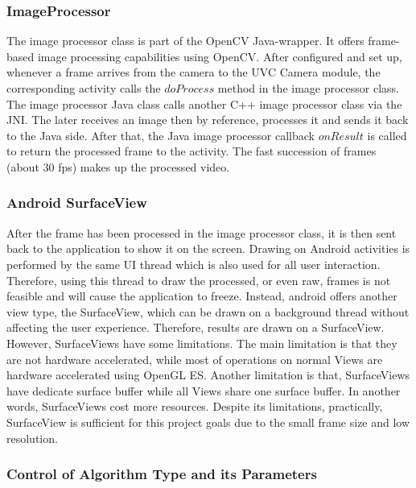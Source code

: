 \subsubsection{ImageProcessor}

The image processor class is part of the OpenCV Java-wrapper. It offers frame-based image processing capabilities using OpenCV. After configured and set up, whenever a frame arrives from the camera to the UVC Camera module, the corresponding activity calls the $doProcess$ method in the image processor class. The image processor Java class calls another C++ image processor class via the JNI. The later receives an image then by reference, processes it and sends it back to the Java side. After that, the Java image processor callback $onResult$ is called to return the processed frame to the activity. The fast succession of frames (about 30 fps) makes up the processed video.


\subsubsection{Android SurfaceView}
After the frame has been processed in the image processor class, it is then sent back to the application to show it on the screen. Drawing on Android activities is performed by the same UI thread which is also used for all user interaction. Therefore, using this thread to draw the processed, or even raw, frames is not feasible and will cause the application to freeze. Instead, android offers another view type, the SurfaceView, which can be drawn on a background thread without affecting the user experience. Therefore, results are drawn on a SurfaceView. 
However, SurfaceViews have some limitations. The main limitation is that they are not hardware accelerated, while most of operations on normal Views are hardware accelerated using OpenGL ES. Another limitation is that, SurfaceViews have dedicate surface buffer while all Views share one surface buffer. In another words, SurfaceViews cost more resources. Despite its limitations, practically, SurfaceView is sufficient for this project goals due to the small frame size and low resolution. 



\subsubsection{Control of Algorithm Type and its Parameters}

